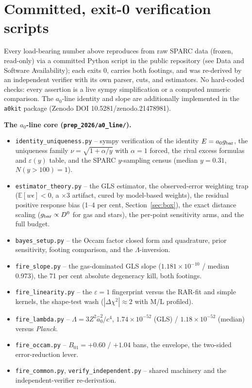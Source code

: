 \documentclass[fleqn,usenatbib]{mnras}
\begin{document}

\appendix

\section{Committed, exit-0 verification scripts}
\label{sec:scripts}

Every load-bearing number above reproduces from raw SPARC data (frozen, read-only) via a committed Python script in the public repository (see Data and Software Availability); each exits 0, carries both footings, and was re-derived by an independent verifier with its own parser, cuts, and estimators. No hard-coded checks: every assertion is a live sympy simplification or a computed numeric comparison. The $a_0$-line identity and slope are additionally implemented in the \texttt{a0kit} package (Zenodo DOI 10.5281/zenodo.21478981).

\textbf{The $a_0$-line core (\texttt{prep\_2026/a0\_line/}).}
\begin{itemize}
\item \texttt{identity\_uniqueness.py} -- sympy verification of the identity $E=a_0 g_{\rm bar}$, the uniqueness family $\nu=\sqrt{1+\alpha/y}$ with $\alpha=1$ forced, the rival excess formulas and $\varepsilon(y)$ table, and the SPARC $y$-sampling census (median $y=0.31$, $N(y>100)=1$).
\item \texttt{estimator\_theory.py} -- the GLS estimator, the observed-error weighting trap ($\mathbb E[w\epsilon]<0$, a $\times3$ artifact, cured by model-based weights), the residual positive response bias (1--4 per cent, Section~\ref{sec:box}), the exact distance scaling ($g_{\rm bar}\propto D^0$ for gas and stars), the per-point sensitivity arms, and the full budget.
\item \texttt{bayes\_setup.py} -- the Occam factor closed form and quadrature, prior sensitivity, footing comparison, and the $\Lambda$-inversion.
\item \texttt{fire\_slope.py} -- the gas-dominated GLS slope ($1.181\times10^{-10}$ / median 0.973), the 71 per cent absolute degeneracy kill, both footings.
\item \texttt{fire\_linearity.py} -- the $\varepsilon=1$ fingerprint versus the RAR-fit and simple kernels, the shape-test wash ($|\Delta\chi^2|\approx2$ with M/L profiled).
\item \texttt{fire\_lambda.py} -- $\Lambda=3Z^2\hat a_0^2/c^4$, $1.74\times10^{-52}$ (GLS) / $1.18\times10^{-52}$ (median) versus \textit{Planck}.
\item \texttt{fire\_occam.py} -- $B_{01}=+0.60$ / $+1.04$ bans, the envelope, the two-sided error-reduction lever.
\item \texttt{fire\_common.py}, \texttt{verify\_independent.py} -- shared machinery and the independent-verifier re-derivation.
\end{itemize}
\end{document}

